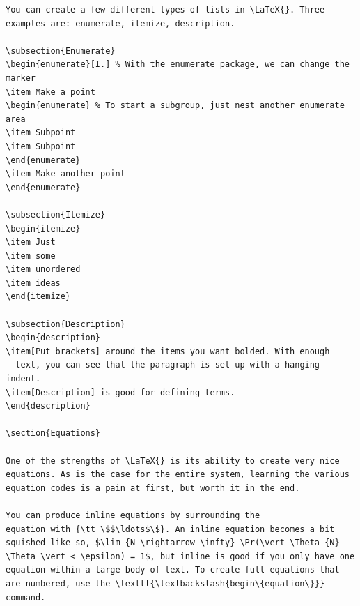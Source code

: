 \documentclass[12pt]{article}
\begin{document}
\begin{verbatim}
You can create a few different types of lists in \LaTeX{}. Three
examples are: enumerate, itemize, description.

\subsection{Enumerate}
\begin{enumerate}[I.] % With the enumerate package, we can change the marker
\item Make a point
\begin{enumerate} % To start a subgroup, just nest another enumerate area
\item Subpoint
\item Subpoint
\end{enumerate}
\item Make another point
\end{enumerate}

\subsection{Itemize}
\begin{itemize}
\item Just
\item some
\item unordered
\item ideas
\end{itemize}

\subsection{Description}
\begin{description}
\item[Put brackets] around the items you want bolded. With enough
  text, you can see that the paragraph is set up with a hanging indent.
\item[Description] is good for defining terms.
\end{description}

\section{Equations}

One of the strengths of \LaTeX{} is its ability to create very nice
equations. As is the case for the entire system, learning the various
equation codes is a pain at first, but worth it in the end.

You can produce inline equations by surrounding the
equation with {\tt \$$\ldots$\$}. An inline equation becomes a bit
squished like so, $\lim_{N \rightarrow \infty} \Pr(\vert \Theta_{N} -
\Theta \vert < \epsilon) = 1$, but inline is good if you only have one
equation within a large body of text. To create full equations that
are numbered, use the \texttt{\textbackslash{begin\{equation\}}} command.


\end{verbatim}
\end{document}
